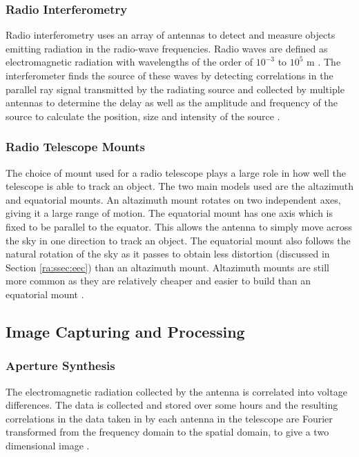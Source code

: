 \subsubsection{Radio Interferometry}\label{ra:ssec:des}
Radio interferometry uses an array of antennas to detect and measure objects emitting radiation in the radio-wave frequencies. Radio waves are defined as electromagnetic radiation with wavelengths of the order of $10^{-3}$ to $10^5$ m \citep{cheng2009radio}. The interferometer finds the source of these waves by detecting correlations in the parallel ray signal transmitted by the radiating source \citep{tasse2016tessellation} and collected by multiple antennas to determine the delay as well as the amplitude and frequency of the source to calculate the position, size and intensity of the source \citep{thompson2008interferometry}.
%
\subsubsection{Radio Telescope Mounts}\label{ra:ssec:mount}
The choice of mount used for a radio telescope plays a large role in how well the telescope is able to track an object. The two main models used are the altazimuth and equatorial mounts. An altazimuth mount rotates on two independent axes, giving it a large range of motion. The equatorial mount has one axis which is fixed to be parallel to the equator. This allows the antenna to simply move across the sky in one direction to track an object. The equatorial mount also follows the natural rotation of the sky as it passes to obtain less distortion (discussed in Section \ref{ra:ssec:eec}) than an altazimuth mount. Altazimuth mounts are still more common as they are relatively cheaper and easier to build than an equatorial mount \citep{thompson2008interferometry}.
%
\subsection{Image Capturing and Processing}\label{ra:sec:ic}
%
\subsubsection{Aperture Synthesis}\label{ra:ssec:rii}
The electromagnetic radiation collected by the antenna is correlated into voltage differences. The data is collected and stored over some hours and the resulting correlations in the data taken in by each antenna in the telescope are Fourier transformed from the frequency domain to the spatial domain, to give a two dimensional image \citep{sault1994multi}.
%
